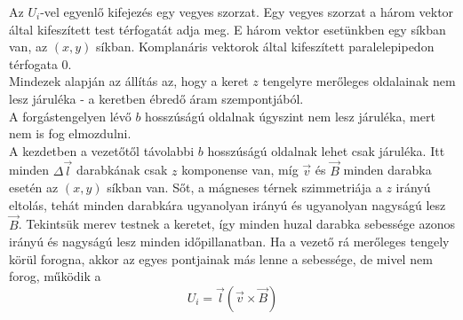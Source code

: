 \documentclass[11pt,a4paper,openany,leqno]{article}
\begin{document}
Az $U_i$-vel egyenlő kifejezés egy vegyes szorzat. Egy vegyes szorzat a három vektor által kifeszített test térfogatát adja meg. E három vektor esetünkben egy síkban van, az $(x,y)$ síkban. Komplanáris vektorok által kifeszített paralelepipedon térfogata $0$.\\ 
\indent
Mindezek alapján az állítás az, hogy a keret $z$ tengelyre merőleges oldalainak nem lesz járuléka - a keretben ébredő áram szempontjából.\\
\indent
A forgástengelyen lévő $b$ hosszúságú oldalnak úgyszint nem lesz járuléka, mert nem is fog elmozdulni.\\ 
\indent 
A kezdetben a vezetőtől távolabbi $b$ hosszúságú oldalnak lehet csak járuléka. Itt minden $\Delta \vec{l}$ darabkának csak $z$ komponense van, míg $\vec{v}$ és $\vec{B}$ minden darabka esetén az $(x,y)$ síkban van. Sőt, a mágneses térnek szimmetriája a $z$ irányú eltolás, tehát minden darabkára ugyanolyan irányú és ugyanolyan nagyságú lesz $\vec{B}$. Tekintsük merev testnek a keretet, így minden huzal darabka sebessége azonos irányú és nagyságú lesz minden időpillanatban. Ha a vezető rá merőleges tengely körül forogna, akkor az egyes pontjainak más lenne a sebessége, de mivel nem forog, működik a
$$ U_i = \vec{l} (\vec{v}\times\vec{B}) $$
\end{document}
